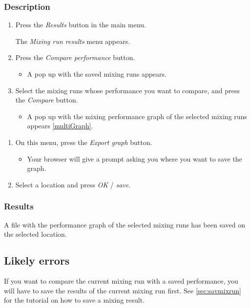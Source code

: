 \subsubsection{Description}
\begin{enumerate}
	\item Press the \emph{Results} button in the main menu.
		\begin{itemize}
            The \emph{Mixing run results} menu appears. 
		\end{itemize}
	\item Press the \emph{Compare performance} button.
		\begin{itemize}
            \item A pop up with the saved mixing runs appears. 
		\end{itemize}
	\item Select the mixing runs whose performance you want to compare, and press the \emph{Compare} button.  
		\begin{itemize}
            \item A pop up with the mixing performance graph of the selected mixing runs appears \ref{multiGraph}.
		\end{itemize}
\end{enumerate}
\begin{enumerate}
	\item On this menu, press the \emph{Export graph} button. 
        \begin{itemize}
            \item Your browser will give a prompt asking you where you want to save the graph.
        \end{itemize}
	\item  Select a location and press \emph{OK} / \emph{save}.
\end{enumerate}


\subsubsection{Results}
A file with the performance graph of the selected mixing runs has been saved on the selected location.

\subsection{Likely errors}
If you want to compare the current mixing run with a saved performance, you will have to save the results of the current mixing run first. See \ref{sec:savmixrun} for the tutorial on how to save a mixing result.

